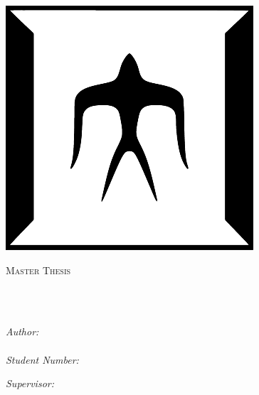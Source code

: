 \documentclass[
11pt, %
english, %
singlespacing, %
headsepline, %
]{MastersDoctoralThesis} %
\author{Jacob \textsc{Lindahl}} %
\begin{document}
\frontmatter %

\pagestyle{plain} %


\begin{titlepage}
\begin{center}
\includegraphics[scale=0.3]{Figures/titech.pdf} \\[0.1cm]
\vspace*{.01\textheight}
{\scshape\LARGE \univname\par}\vspace{1.5cm} %
\textsc{\Large Master Thesis}\\[0.5cm] %

\HRule \\[0.4cm] %
{\huge \bfseries \ttitle\par}\vspace{0.4cm} %
\HRule \\[1.5cm] %

\begin{minipage}[t]{0.4\textwidth}
\begin{flushleft} \large
\emph{Author:}\\
\href{https://prg.is.titech.ac.jp/people/jacob-lindahl/}{\authorname}\\[0.3cm] %
\emph{Student Number:}\\
\textsc{\studentnumname}
\end{flushleft}
\end{minipage}
\begin{minipage}[t]{0.4\textwidth}
\begin{flushright} \large
\emph{Supervisor:} \\
\href{http://prg.is.titech.ac.jp/people/masuhara/}{\supname} %
\end{flushright}
\end{minipage}\\[3cm]


\end{center}
\end{titlepage}
\end{document}
